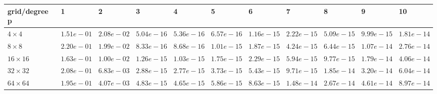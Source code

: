\begin{tabular}{lllllllllll}
\hline
 grid/degree p   & 1          & 2          & 3          & 4          & 5          & 6          & 7          & 8          & 9          & 10         \\
\hline
 $4 \times 4$    & $1.51e-01$ & $2.08e-02$ & $5.04e-16$ & $5.36e-16$ & $6.57e-16$ & $1.16e-15$ & $2.22e-15$ & $5.09e-15$ & $9.99e-15$ & $1.81e-14$ \\
 $8 \times 8$    & $2.20e-01$ & $1.99e-02$ & $8.33e-16$ & $8.68e-16$ & $1.01e-15$ & $1.87e-15$ & $4.24e-15$ & $6.44e-15$ & $1.07e-14$ & $2.76e-14$ \\
 $16 \times 16$  & $1.63e-01$ & $1.00e-02$ & $1.26e-15$ & $1.03e-15$ & $1.75e-15$ & $2.29e-15$ & $5.94e-15$ & $9.77e-15$ & $1.79e-14$ & $4.06e-14$ \\
 $32 \times 32$  & $2.08e-01$ & $6.83e-03$ & $2.88e-15$ & $2.77e-15$ & $3.73e-15$ & $5.43e-15$ & $9.71e-15$ & $1.85e-14$ & $3.20e-14$ & $6.04e-14$ \\
 $64 \times 64$  & $1.95e-01$ & $4.07e-03$ & $4.83e-15$ & $4.65e-15$ & $5.86e-15$ & $8.63e-15$ & $1.48e-14$ & $2.67e-14$ & $4.61e-14$ & $8.97e-14$ \\
\hline
\end{tabular}